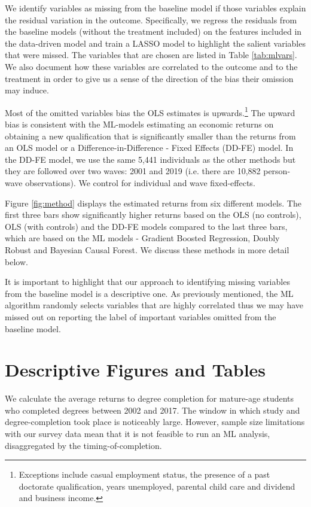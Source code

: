 \documentclass[12pt, a4paper]{article}
\begin{document}
We identify variables as missing from the baseline model if those variables explain the residual variation in the outcome. Specifically, we regress the residuals from the baseline models (without the treatment included) on the features included in the data-driven model and train a LASSO model to highlight the salient variables that were missed. The variables that are chosen are listed in Table \ref{tab:mlvars}. We also document how these variables are correlated to the outcome and to the treatment in order to give us a sense of the direction of the bias their omission may induce. 

Most of the omitted variables bias the OLS estimates is upwards.\footnote{Exceptions include casual employment status, the presence of a past doctorate qualification, years unemployed, parental child care and dividend and business income.} The upward bias is consistent with the ML-models estimating an economic returns on obtaining a new qualification that is significantly smaller than the returns from an OLS model or a Difference-in-Difference - Fixed Effects (DD-FE)  model. In the DD-FE model, we use the same 5,441 individuals as the other methods but they are followed over two waves: 2001 and 2019 (i.e. there are 10,882 person-wave observations). We control for individual and wave fixed-effects. 

Figure \ref{fig:method} displays the estimated returns from six different models. The first three bars show significantly higher returns based on the OLS (no controls), OLS (with controls) and the DD-FE models compared to the last three bars, which are based on the ML models - Gradient Boosted Regression, Doubly Robust and Bayesian Causal Forest. We discuss these methods in more detail below. 

It is important to highlight that our approach to identifying missing variables
from the baseline model is a descriptive one. As previously mentioned,
the ML algorithm randomly selects variables that are highly correlated thus we
may have missed out on reporting the label of important variables omitted from
the baseline model.


\section{Descriptive Figures and Tables}

We calculate the average returns to degree completion for mature-age students who completed degrees between 2002 and 2017. The window in which study and degree-completion took place is noticeably large. However, sample size limitations with our survey data mean that it is not feasible to run an ML analysis, disaggregated by the timing-of-completion.
\end{document}
